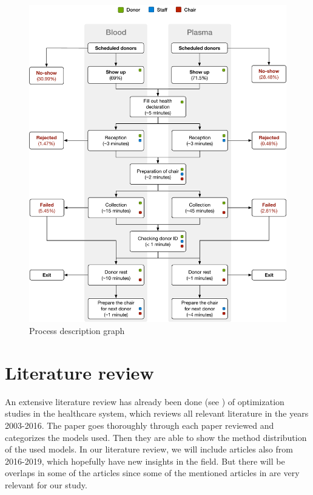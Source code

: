 \documentclass[a4paper,12pt]{article}
\begin{document}


\begin{figure}[H]
    \begin{center}
    \includegraphics[scale=0.6]{process.pdf}
    \end{center}
    \caption{Process description graph}
    \label{flow}
\end{figure}



\section*{Literature review}

An extensive literature review has already been done (see \cite{BD32}) of optimization studies in the healthcare system, which reviews all relevant literature in the years 2003-2016. The paper goes thoroughly through each paper reviewed and categorizes the models used. Then they are able to show the method distribution of the used models. In our literature review, we will include articles also from 2016-2019, which hopefully have new insights in the field. But there will be overlaps in some of the articles since some of the mentioned articles in \cite{BD32} are very relevant for our study.
\end{document}
